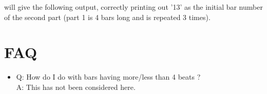 \documentclass[11pt]{article}
\begin{document}
will give the following output, correctly printing out '13' as the initial bar number of the second part (part 1 is 4 bars long and is repeated 3 times).

\resetchordbars
\begin{chordbar}{4}{3}{}
\end{chordbar}

\begin{chordbar}{4}{1}{}
\end{chordbar}


\section{FAQ}

\begin{itemize}
\item Q: How do I do with bars having more/less than 4 beats ? \\
A: This has not been considered here.
\end{itemize}
\end{document}
